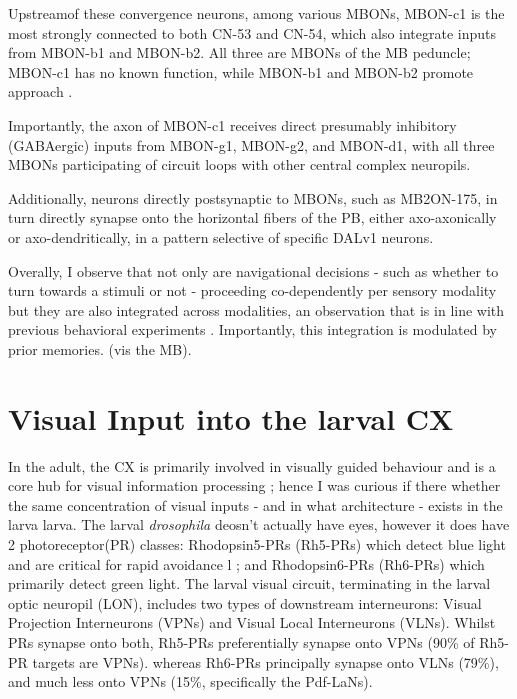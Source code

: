     Upstreamof these convergence neurons, among various MBONs, MBON-c1 is the most strongly connected to both CN-53 and CN-54, which also integrate inputs from MBON-b1 and MBON-b2. All three are MBONs of the MB peduncle; MBON-c1 has no known function, while MBON-b1 and MBON-b2 promote approach \citep{eschbach2021circuits}.

   Importantly, the axon of MBON-c1 receives direct presumably inhibitory (GABAergic) inputs from MBON-g1, MBON-g2, and MBON-d1, with all three MBONs participating of circuit loops with other central complex neuropils.

    Additionally, neurons directly postsynaptic to MBONs, such as MB2ON-175, in turn directly synapse onto the horizontal fibers of the PB, either axo-axonically or axo-dendritically, in a pattern selective of specific DALv1 neurons.

    Overally, I observe that not only are navigational decisions - such as whether to turn towards a stimuli or not - proceeding co-dependently per sensory modality but they are also integrated across modalities, an observation that is in line with previous behavioral experiments \citep{gepner2015computations}. Importantly, this integration is modulated by prior memories. (vis the MB). 

\section{Visual Input into the larval CX}
\label{CXvisual}  
    In the adult, the CX is primarily involved in visually guided behaviour and is a core hub for visual information processing \citep{omoto2017visual, hulse2021connectome}; hence I was curious  if there whether the same concentration of visual inputs - and in what architecture - exists in the larva larva.
    The larval \textit{drosophila} deosn't actually have eyes, however it does have 2  photoreceptor(PR) classes:  Rhodopsin5-PRs (Rh5-PRs) which detect blue light and are critical for rapid avoidance l \citep{keene2011distinct}; and Rhodopsin6-PRs (Rh6-PRs) which primarily detect green light. 
    The larval visual circuit, terminating in the larval optic neuropil (LON), includes two types of downstream interneurons:  Visual Projection Interneurons (VPNs) and Visual Local Interneurons (VLNs). Whilst PRs synapse onto both, Rh5-PRs preferentially synapse onto VPNs (90\% of Rh5-PR targets are VPNs).
    whereas Rh6-PRs principally synapse onto VLNs (79\%), and much less onto VPNs (15\%, specifically the Pdf-LaNs). 

